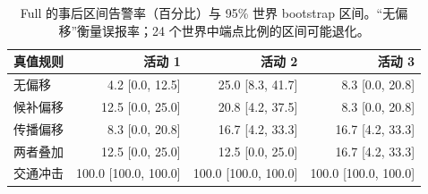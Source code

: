 \begin{table}[tbp]
\centering
\caption{Full 的事后区间告警率（百分比）与 95\% 世界 bootstrap 区间。“无偏移”衡量误报率；24 个世界中端点比例的区间可能退化。}
\label{tab:stress}
\scriptsize
\setlength{\tabcolsep}{3pt}
\begin{tabular}{lrrr}
\toprule
真值规则 & 活动 1 & 活动 2 & 活动 3 \\
\midrule
无偏移 & 4.2 [0.0, 12.5] & 25.0 [8.3, 41.7] & 8.3 [0.0, 20.8] \\
候补偏移 & 12.5 [0.0, 25.0] & 20.8 [4.2, 37.5] & 8.3 [0.0, 20.8] \\
传播偏移 & 8.3 [0.0, 20.8] & 16.7 [4.2, 33.3] & 16.7 [4.2, 33.3] \\
两者叠加 & 12.5 [0.0, 25.0] & 12.5 [0.0, 25.0] & 16.7 [4.2, 33.3] \\
交通冲击 & 100.0 [100.0, 100.0] & 100.0 [100.0, 100.0] & 100.0 [100.0, 100.0] \\
\bottomrule
\end{tabular}
\end{table}
